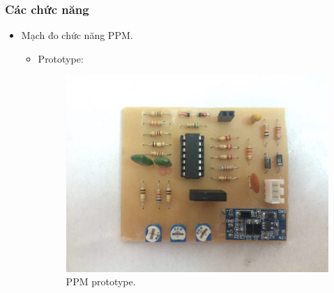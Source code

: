 \documentclass[a4paper,12pt,oneside]{article}
\begin{document}
\subsubsection{Các chức năng}
\begin{itemize}
	\item Mạch đo chức năng PPM.
		\begin{itemize}
\item Prototype:
	\begin{figure}[H]
	\centering
	\includegraphics[scale=.3]{hinh/PPM/ppm_pro.jpg}
	\caption{PPM prototype.}
	\end{figure}
	

\end{itemize}
\end{itemize}
\end{document}
